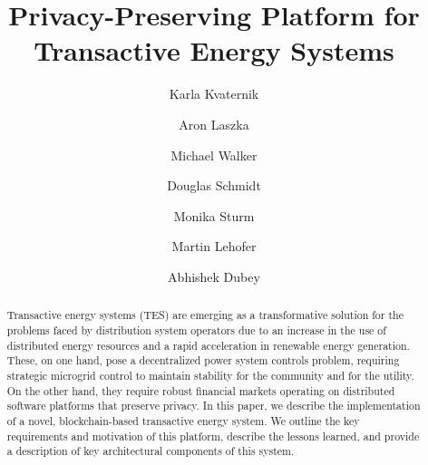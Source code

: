 \documentclass[sigplan]{acmart}
\begin{document}
\setlength{\marginparwidth}{1.5cm}

\title{Privacy-Preserving Platform for Transactive Energy Systems}


\author{Karla Kvaternik}

\author{Aron Laszka}

\author{Michael Walker}

\author{Douglas Schmidt}

\author{Monika Sturm}

\author{Martin Lehofer}

\author{Abhishek Dubey}


\vspace{-0.1in}



\renewcommand{\shortauthors}{K. Kvaternik et al.}





\begin{abstract}
Transactive energy systems (TES) are emerging as a transformative solution for the problems faced by distribution system operators due to an increase in the use of distributed energy resources and a rapid acceleration in renewable energy generation. These, on one hand, pose a decentralized power system controls problem, requiring strategic microgrid control to maintain stability for the community and for the utility. On the other hand, they require robust financial markets operating on distributed software platforms that preserve privacy. In this paper, we describe the implementation of a novel, blockchain-based transactive energy system. We outline the key requirements and motivation of this platform, describe the lessons learned, and provide a description of key architectural components of this system.
\end{abstract}
\end{document}
